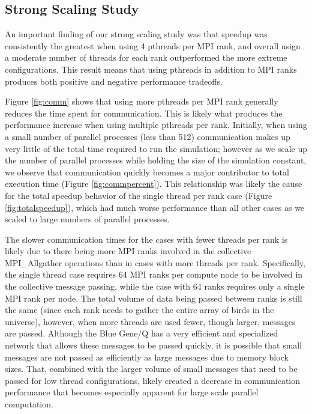 \subsection*{Strong Scaling Study}

An important finding of our strong scaling study was that speedup was consistently
the greatest when using 4 pthreads per MPI rank, and overall usign a moderate number of
threads for each rank outperformed the more extreme configurations. This result
means that using pthreads in addition to MPI ranks produces both positive and
negative performance tradeoffs.

Figure \ref{fig:comm} shows that using more pthreads per MPI rank generally
reduces the time spent for communication. This is likely what produces the performance
increase when using multiple pthreads per rank. Initially, when using a small
number of parallel processes (less than 512) communication makes up very little
of the total time required to run the simulation; however as we scale up the
number of parallel processes while holding the size of the simulation constant,
we observe that communication quickly becomes a major contributor to total
execution time (Figure \ref{fig:commpercent}). This relationship was likely the
cause for the total speedup behavior of the single thread per rank case (Figure
\ref{fig:totalspeedup}), which had much worse performance than all other cases as we
scaled to large numbers of parallel processes.

The slower communication times for the cases with fewer threads per rank is
likely due to there being more MPI ranks involved in the collective MPI\_Allgather
operations than in cases with more threads per rank. Specifically, the single
thread case requires 64 MPI ranks per compute node to be involved in the collective
message passing, while the case with 64 ranks requires only a single MPI rank per
node. The total volume of data being passed between ranks is still the same
(since each rank needs to gather the entire array of birds in the universe),
however, when more threads are used fewer, though larger, messages are passed.
Although the Blue Gene/Q has a very efficient and specialized network that allows
these messages to be passed quickly, it is possible that small messages are not
passed as efficiently as large messages due to memory block sizes. That, combined
with the larger volume of small messages that need to be passed for low thread
configurations, likely created a decrease in communication performance that
becomes especially apparent for large scale parallel computation.

